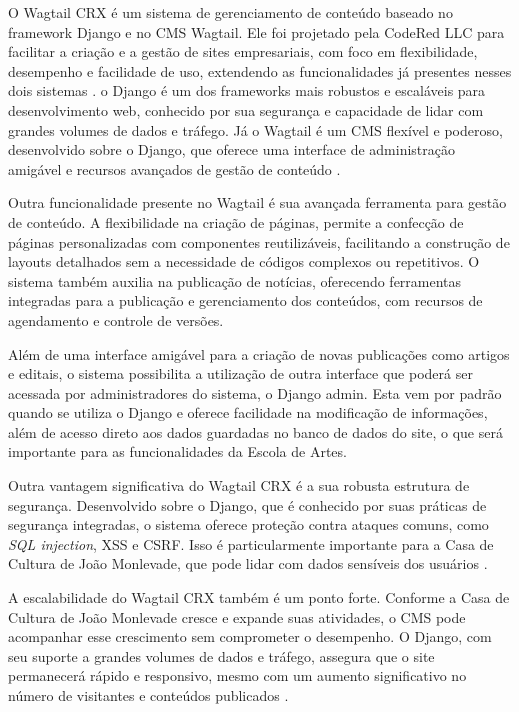 O Wagtail CRX é um sistema de gerenciamento de conteúdo baseado no framework Django e no \ac{CMS} Wagtail. Ele foi projetado pela CodeRed LLC para facilitar a criação e a gestão de sites empresariais, com foco em flexibilidade, desempenho e facilidade de uso, extendendo as funcionalidades já presentes nesses dois sistemas \cite{WagtailCRX}. o Django é um dos frameworks mais robustos e escaláveis para desenvolvimento web, conhecido por sua segurança e capacidade de lidar com grandes volumes de dados e tráfego. Já o Wagtail é um \ac{CMS} flexível e poderoso, desenvolvido sobre o Django, que oferece uma interface de administração amigável e recursos avançados de gestão de conteúdo \cite{Wagtail}.

Outra funcionalidade presente no Wagtail é sua avançada ferramenta para gestão de conteúdo. A flexibilidade na criação de páginas, permite a confecção de páginas personalizadas com componentes reutilizáveis, facilitando a construção de layouts detalhados sem a necessidade de códigos complexos ou repetitivos. O sistema também auxilia na publicação de notícias, oferecendo ferramentas integradas para a publicação e gerenciamento dos conteúdos, com recursos de agendamento e controle de versões.

Além de uma interface amigável para a criação de novas publicações como artigos e editais, o sistema possibilita a utilização de outra interface que poderá ser acessada por administradores do sistema, o Django admin. Esta vem por padrão quando se utiliza o Django e oferece facilidade na modificação de informações, além de acesso direto aos dados guardadas no banco de dados do site, o que será importante para as funcionalidades da Escola de Artes.

Outra vantagem significativa do Wagtail CRX é a sua robusta estrutura de segurança. Desenvolvido sobre o Django, que é conhecido por suas práticas de segurança integradas, o sistema oferece proteção contra ataques comuns, como \textit{SQL injection}, \ac{XSS} e \ac{CSRF}. Isso é particularmente importante para a Casa de Cultura de João Monlevade, que pode lidar com dados sensíveis dos usuários \cite{DjangoCSRF}.

A escalabilidade do Wagtail CRX também é um ponto forte. Conforme a Casa de Cultura de João Monlevade cresce e expande suas atividades, o \ac{CMS} pode acompanhar esse crescimento sem comprometer o desempenho. O Django, com seu suporte a grandes volumes de dados e tráfego, assegura que o site permanecerá rápido e responsivo, mesmo com um aumento significativo no número de visitantes e conteúdos publicados \cite{ghimire2020comparative}.

